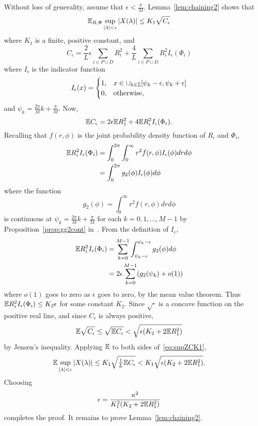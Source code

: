 \documentclass[journal]{IEEEtran}
\begin{document}
\begin{IEEEproof}
Without loss of generality, assume that $\epsilon < \tfrac{\pi}{M}$.  Lemma~\ref{lem:chaining2} shows that
\begin{equation}\label{eq:supZCK1} 
{\mathbb E}_{R,\Phi} \sup_{{\vert \lambda \vert} < \epsilon} {\left\vert  X(\lambda)  \right\vert} \leq K_1 \sqrt{C_\epsilon}
\end{equation}
where $K_1$ is a finite, positive constant, and
\begin{equation}\label{eq:Cepsdefn}
C_\epsilon = \frac{2}{L}\epsilon\sum_{i\in P \cup D}R_i^2 + \frac{4}{L}\sum_{i\in P \cup D}R_i^2 I_{\epsilon}(\Phi_i)
\end{equation}
where $I_\epsilon$ is the indicator function
\[
I_{\epsilon}(x) = \begin{cases}
1, & x \in \cup_{k\in{\mathbb Z}}[\psi_k - \epsilon, \psi_k + \epsilon] \\
0, & \text{otherwise},
\end{cases}
\] 
and $\psi_k = \tfrac{2\pi}{M}k + \tfrac{\pi}{M}$.  Now,
\[
{\mathbb E} C_\epsilon =  2\epsilon{\mathbb E} R_1^2 + 4 {\mathbb E} R_i^2 I_{\epsilon}(\Phi_i).
\]
Recalling that $f(r,\phi)$ is the joint probability density function of $R_i$ and $\Phi_i$,
\begin{align*}
{\mathbb E} R_i^2 I_\epsilon(\Phi_i) &= \int_0^{2\pi} \int_{0}^\infty  r^2 f(r,\phi) I_\epsilon(\phi) dr d\phi \\ 
&= \int_0^{2\pi}g_2(\phi) I_\epsilon(\phi) d\phi 
\end{align*}
where the function
\[
g_2(\phi) = \int_{0}^\infty  r^2 f(r,\phi) dr d\phi 
\]
is continuous at $\psi_k = \tfrac{2\pi}{M}k + \tfrac{\pi}{M}$ for each $k = 0, 1, \dots, M-1$ by Proposition~\ref{prop:gg2cont} in~\cite{McKilliam_leastsqPSKpilotsdata_2012}.  From the definition of $I_\epsilon$,
\begin{align*}
{\mathbb E} R_i^2 I_\epsilon(\Phi_i) &= \sum_{k=0}^{M-1}\int_{\psi_k-\epsilon}^{\psi_k-\epsilon}g_2(\phi) d\phi \\
&= 2\epsilon \sum_{k=0}^{M-1} (g_2(\psi_k) + o(1))
\end{align*}
where $o(1)$ goes to zero as $\epsilon$ goes to zero, by the mean value theorem.  Thus ${\mathbb E} R_i^2 I_\epsilon(\Phi_i) \leq K_2\epsilon$ for some constant $K_2$. Since $\sqrt{\cdot}$ is a concave function on the positive real line, and since $C_{\epsilon}$ is always positive,
\[
{\mathbb E} \sqrt{C_\epsilon} \leq  \sqrt{{\mathbb E}  C_\epsilon} < \sqrt{\epsilon( K_2 + 2{\mathbb E} R_1^2)  }
\]
by Jensen's inequality.  Applying ${\mathbb E}$ to both sides of~\eqref{eq:supZCK1},
\[
{\mathbb E} \sup_{{\vert \lambda \vert} < \epsilon} {\left\vert  X(\lambda)  \right\vert} \leq K_1 \sqrt{\tfrac{1}{L}{\mathbb E} C_\epsilon} < K_1 \sqrt{\epsilon( K_2 + 2{\mathbb E} R_1^2)}.
\]
Choosing 
\[
\epsilon = \frac{\kappa^2}{ K_1^2 ( K_2 + 2{\mathbb E} R_1^2)}
\] 
completes the proof.  It remains to prove Lemma~\ref{lem:chaining2}.
\end{IEEEproof}
\end{document}
